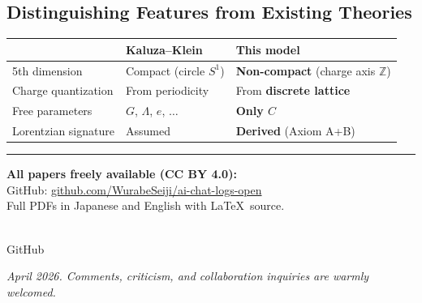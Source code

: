 \documentclass[11pt,a4paper]{article}
\begin{document}
\vspace{8pt}

\subsection*{Distinguishing Features from Existing Theories}

\vspace{-2pt}
\begin{center}
\begin{tabular}{lll}
\toprule
& \textbf{Kaluza--Klein} & \textbf{This model} \\
\midrule
5th dimension & Compact (circle $S^1$) & \textbf{Non-compact} (charge axis $\mathbb{Z}$) \\
Charge quantization & From periodicity & From \textbf{discrete lattice} \\
Free parameters & $G$, $\Lambda$, $e$, $\ldots$ & \textbf{Only $C$} \\
Lorentzian signature & Assumed & \textbf{Derived} (Axiom A+B) \\
\bottomrule
\end{tabular}
\end{center}

\vspace{12pt}
\hrule
\vspace{8pt}

\begin{center}
\begin{minipage}[c]{0.6\textwidth}
\small
\textbf{All papers freely available (CC BY 4.0):}\\
GitHub: \href{https://github.com/WurabeSeiji/ai-chat-logs-open}{github.com/WurabeSeiji/ai-chat-logs-open}\\
Full PDFs in Japanese and English with \LaTeX\ source.
\end{minipage}%
\hfill
\begin{minipage}[c]{0.15\textwidth}
\centering
{}\\[2pt]
{\scriptsize GitHub}
\end{minipage}
\end{center}

\vspace{6pt}
{\small\textit{April 2026. Comments, criticism, and collaboration inquiries are warmly welcomed.}}
\end{document}
